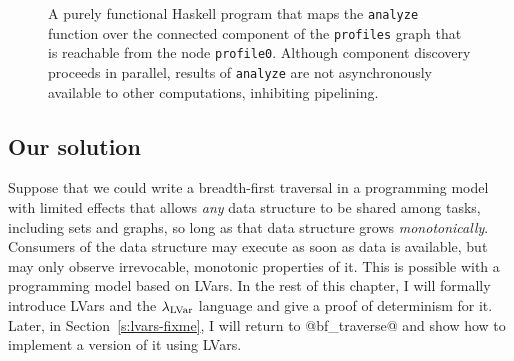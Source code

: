 \begin{figure}
  
  \caption{\footnotesize A purely functional Haskell program that maps
    the \lstinline|analyze| function over the connected component of
    the \lstinline|profiles| graph that is reachable from the node
    \lstinline|profile0|.  Although component discovery proceeds in
    parallel, results of \lstinline|analyze| are not asynchronously
    available to other computations, inhibiting pipelining.}
  \label{f:bfs-pure}
\end{figure}

\subsection{Our solution}

Suppose that we could write a breadth-first traversal in a programming
model with limited effects that allows \emph{any} data structure to be
shared among tasks, including sets and graphs, so long as that data
structure grows \emph{monotonically}.  Consumers of the data structure
may execute as soon as data is available, but may only observe
irrevocable, monotonic properties of it. This is possible with a
programming model based on LVars.  In the rest of this chapter, I will
formally introduce LVars and the $\lambda_{\textrm{LVar}}$ language and give a
proof of determinism for it.  Later, in
Section~\ref{s:lvars-fixme}, I
will return to @bf_traverse@ and show how to implement a version of it
using LVars.
